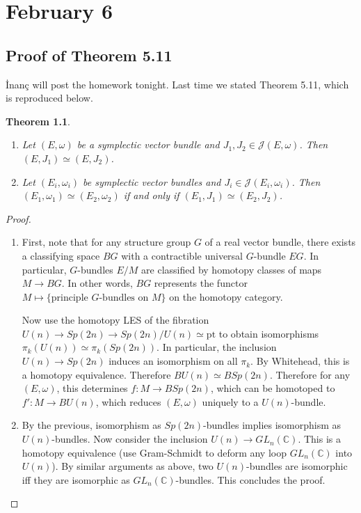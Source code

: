 \documentclass[leqno, openany]{memoir}
\theoremstyle{definition}
\theoremstyle{remark}
\theoremstyle{plain}
\newtheorem*{thm*}{Theorem}
\theoremstyle{definition}
\theoremstyle{remark}
\renewcommand{\C}{\mathbb{C}}
\newcommand{\mc}[1]{\mathcal{#1}}
\newcommand{\mr}[1]{\mathrm{#1}}
\begin{document}
\chapter{February 6}%
\label{cha:february_6}

\section{Proof of Theorem 5.11}%
\label{sec:proof_of_theorem_5_11}


\.Inan\c{c} will post the homework tonight. Last time we stated Theorem 5.11, which is reproduced below.

\begin{thm*}
    \begin{enumerate}
        \item Let $(E, \omega)$ be a symplectic vector bundle and $J_1, J_2 \in \mc{J}(E, \omega)$. Then $(E, J_1) \simeq (E, J_2)$.
        \item Let $(E_i, \omega_i)$ be symplectic vector bundles and $J_i \in \mc{J}(E_i, \omega_i)$. Then $(E_1, \omega_1) \simeq (E_2, \omega_2)$ if and only if $(E_1, J_1) \simeq (E_2, J_2)$.
    \end{enumerate}
\end{thm*}

\begin{proof}
    \begin{enumerate}
        \item First, note that for any structure group $G$ of a real vector bundle, there exists a classifying space $BG$ with a contractible universal $G$-bundle $EG$. In particular, $G$-bundles $E/M$ are classified by homotopy classes of maps $M \to BG$. In other words, $BG$ represents the functor $M \mapsto \{ \text{principle } G\text{-bundles on }M \}$ on the homotopy category.

            Now use the homotopy LES of the fibration $U(n) \to Sp(2n) \to Sp(2n)/U(n) \simeq \mr{pt}$ to obtain isomorphisms $\pi_k(U(n)) \simeq \pi_k(Sp(2n))$. In particular, the inclusion $U(n) \to Sp(2n)$ induces an isomorphism on all $\pi_k$. By Whitehead, this is a homotopy equivalence. Therefore $BU(n) \simeq BSp(2n)$. Therefore for any $(E,\omega)$, this determines $f: M \to BSp(2n)$, which can be homotoped to $f': M \to BU(n)$, which reduces $(E, \omega)$ uniquely to a $U(n)$-bundle.
        \item By the previous, isomorphism as $Sp(2n)$-bundles implies isomorphism as $U(n)$-bundles. Now consider the inclusion $U(n) \to GL_n(\C)$. This is a homotopy equivalence (use Gram-Schmidt to deform any loop $GL_n(\C)$ into $U(n)$). By similar arguments as above, two $U(n)$-bundles are isomorphic iff they are isomorphic as $GL_n(\C)$-bundles. This concludes the proof. \qedhere
    \end{enumerate}
\end{proof}
\end{document}
